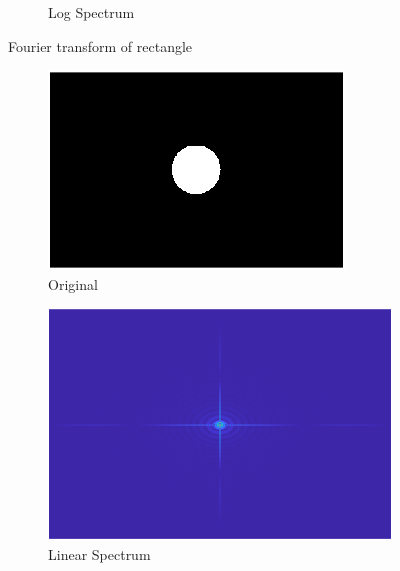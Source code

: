 \begin{figure}[!ht]
\begin{subfigure}{0.32\textwidth}
        \caption{Log Spectrum}
    \end{subfigure}
    \caption{Fourier transform of rectangle}
\end{figure}

\begin{figure}[!ht]
    \centering
    \begin{subfigure}{0.32\textwidth}
        \centering
        \includegraphics[width=\textwidth]{Doc/Graphics/Part1/Q3_circ.png}
        \caption{Original}
    \end{subfigure}
    \hfill
    \begin{subfigure}{0.32\textwidth}
        \centering
        \includegraphics[width=\textwidth]{Doc/Graphics/Part1/Q13_Circle.png}
        \caption{Linear Spectrum}
    \end{subfigure}
    \hfill
    \begin{subfigure}{0.32\textwidth}

\end{subfigure}
\end{figure}

